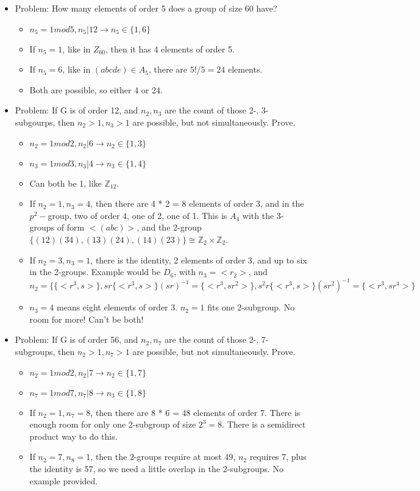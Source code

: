 \documentclass[11pt, oneside]{article}   	%
\begin{document}
\begin{itemize}
\item Problem: How many elements of order 5 does a group of size 60 have?
\begin{itemize}
\item $n_5 = 1 mod 5, n_5 | 12 \rightarrow n_5 \in \{1, 6\}$
\item If $n_5 = 1$, like in $Z_{60}$, then it has 4 elements of order 5.
\item If $n_5 = 6$, like in $(abcde) \in A_5$, there are $5! / 5 = 24$ elements.  
\item Both are possible, so either 4 or 24.
\end{itemize}

\item Problem: If G is of order 12, and $n_2, n_3$ are the count of those 2-, 3-subgourps, then $n_2 > 1, n_3 > 1$ are possible, but not simultaneously. Prove.
\begin{itemize}
\item $n_2 = 1 mod 2, n_2 | 6 \rightarrow n_2 \in \{1, 3\}$
\item $n_3= 1 mod 3, n_3 | 4 \rightarrow n_3 \in \{1, 4\}$
\item Can both be 1, like $\mathbb{Z}_{12}$.
\item If $n_2 = 1, n_3 = 4$, then there are 4 * 2 = 8 elements of order 3, and in the $p^2-$group, two of order 4, one of 2, one of 1.  This is $A_4$ with the 3-groups of form $<(abc)>$, and the 2-group $\{(12)(34), (13)(24), (14)(23)\} \cong \mathbb{Z}_2 \times \mathbb{Z}_2$.
\item If $n_2 = 3, n_3 = 1$, there is the identity, 2 elements of order 3, and up to six in the 2-groups.  Example would be $D_6$, with $n_3 = <r_2>$, and $n_2 = \{\{<r^3, s>\}, sr\{<r^3, s>\}(sr)^{-1} = \{<r^3, sr^2>\},  s^2r\{<r^3, s>\}(sr^2)^{-1} = \{<r^3, sr^4>\}$
\item $n_3 = 4$ means eight elements of order 3.  $n_2 = 1$ fits one 2-subgroup.  No room for more!  Can't be both!
\end{itemize}


\item Problem: If G is of order 56, and $n_2, n_7$ are the count of those 2-, 7-subgroups, then $n_2 > 1, n_7 > 1$ are possible, but not simultaneously. Prove.
\begin{itemize}
\item $n_2= 1 mod 2, n_2 | 7 \rightarrow n_2 \in \{1, 7\}$
\item $n_ 7= 1 mod 7, n_7 | 8 \rightarrow n_3 \in \{1, 8\}$
\item If $n_2 = 1, n_7 = 8$, then there are 8 * 6 = 48 elements of order 7.  There is enough room for only one 2-subgroup of size $2^3 = 8$.   There is a semidirect product way to do this.
\item If $n_2 = 7, n_8 = 1$,  then the 2-groups require at most 49, $n_2$ requires 7, plus the identity is 57, so we need a little overlap in the 2-subgroups.  No example provided.
\end{itemize}



\end{itemize}
\end{document}
